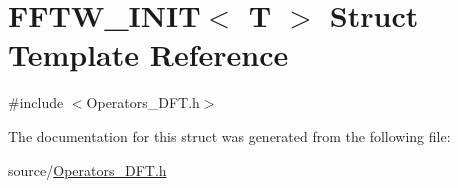 \hypertarget{struct_f_f_t_w___i_n_i_t}{}\section{F\+F\+T\+W\+\_\+\+I\+N\+I\+T$<$ T $>$ Struct Template Reference}
\label{struct_f_f_t_w___i_n_i_t}


{\ttfamily \#include $<$Operators\+\_\+\+D\+F\+T.\+h$>$}



The documentation for this struct was generated from the following file\+:\begin{DoxyCompactItemize}
\item 
source/\hyperlink{_operators___d_f_t_8h}{Operators\+\_\+\+D\+F\+T.\+h}\end{DoxyCompactItemize}
